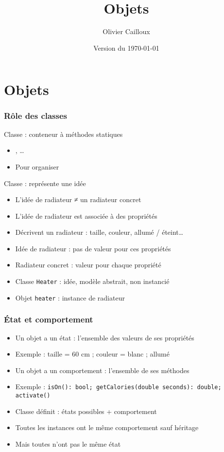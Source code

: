 \documentclass[english, french]{beamer}
\title{Objets}
\subtitle{}
\author{Olivier Cailloux}
\institute[LAMSADE]{LAMSADE, Université Paris-Dauphine}
\date{Version du \today}
\begin{document}


\begin{frame}[plain]
   \titlepage
\end{frame}
\addtocounter{framenumber}{-1}

\section{Objets}
\begin{frame}
	\frametitle{Rôle des classes}
	Classe : conteneur à méthodes statiques
	\begin{itemize}
		\item {}, …
		\item Pour organiser
	\end{itemize}
	Classe : représente une idée
	\begin{itemize}
		\item L’idée de radiateur ≠ un radiateur concret
		\item L’idée de radiateur est associée à des propriétés 
		\item Décrivent un radiateur : taille, couleur, allumé / éteint…
		\item Idée de radiateur : pas de valeur pour ces propriétés
		\item Radiateur concret : valeur pour chaque propriété
		\item Classe \texttt{Heater} : idée, modèle abstrait, non instancié
		\item Objet \texttt{heater} : instance de radiateur
	\end{itemize}
\end{frame}

\begin{frame}
	\frametitle{État et comportement}
	\begin{itemize}
		\item Un objet a un état : l’ensemble des valeurs de ses propriétés
		\item Exemple : {taille = 60 cm ; couleur = blanc ; allumé}
		\item Un objet a un comportement : l’ensemble de ses méthodes
		\item Exemple : \texttt{isOn(): bool; getCalories(double seconds): double; activate()}
		\item Classe définit : états possibles + comportement
		\item Toutes les instances ont le même comportement {\tiny sauf héritage}
		\item Mais toutes n’ont pas le même état
	\end{itemize}
\end{frame}
\end{document}
